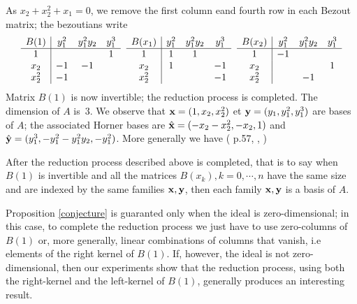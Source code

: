 \documentclass{standalone}
\begin{document}
As $x_2 + x_2^{2} + x_1 = 0$, we remove the first column eand fourth row in each Bezout matrix; the bezoutians write
$$
\begin{array}{c|ccc}
	B(1) & y_1^2 & y_1^2y_2 & y_1^3 \\
	\hline
	1  &  &  & 1 \\
	x_2  & -1 & -1 & \\
	x_2^2 & -1 &  &
\end{array}
\hspace{0.2cm}
\begin{array}{c|ccc}
	B(x_1) & y_1^2 & y_1^2y_2 & y_1^3 \\
	\hline
	1  & 1 & 1 & \\
	x_2  & 1 &  & -1\\
	x_2^2  &  &  & -1
\end{array}
\hspace{0.2cm}
\begin{array}{c|ccc}
	B(x_2) & y_1^2 & y_1^2y_2 & y_1^3 \\
	\hline
	1  & -1 &  & \\
	x_2  &  &  & 1 \\
	x_2^2  &  & -1 &
\end{array}$$
Matrix $B(1)$ is now invertible; the reduction process is completed. The dimension of $A$ is~$3$. We observe that $\bold{x} = (1, x_2, x_2^{2})$ et $\bold{y} = (y_1, y_1^{2}, y_1^{3})$ are bases of $A$; the associated Horner bases are $\hat{\bold{x}} = (-x_2-x_2^{2}, -x_{2}, 1)$ and $\hat{\bold{y}} = (y_1^{3}, -y_1^{2}-y_1^{2}y_2, -y_1^{2})$.
More generally we have (\cite{jpc} p.57, \cite{bm}, \cite{tm})
\begin{prop}
\label{conjecture}
After the reduction process described above is completed, that is to say when $B(1)$ is invertible and all the matrices $B(x_k), k=0, \cdots, n$ have the same size and are indexed by the same families $\bold{x, y}$, then each family $\bold{x, y}$ is a basis of $A$.
\end{prop}

\begin{rem}
Proposition \ref{conjecture} is guaranted only when the ideal is zero-dimensional; in this case, to complete the reduction process we just have to use zero-columns of $B(1)$ or, more generally, linear combinations of columns that vanish, i.e elements of the right kernel of $B(1)$. If, however, the ideal is not zero-dimensional, then our experiments show that the reduction process, using both the right-kernel and the left-kernel of $B(1)$, generally produces an interesting result.
\end{rem}
\end{document}

